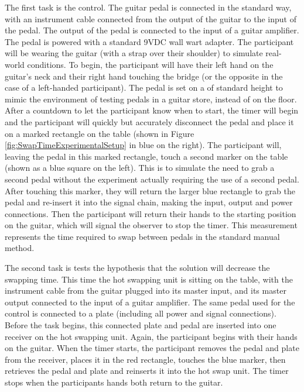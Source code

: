 \documentclass{article}
\begin{document}
	The first task is the control.  The guitar pedal is connected in the standard way, with an instrument cable connected from the output of the guitar to the input of the pedal.  The output of the pedal is connected to the input of a guitar amplifier.  The pedal is powered with a standard 9VDC wall wart adapter. The participant will be wearing the guitar (with a strap over their shoulder) to simulate real-world conditions.  To begin, the participant will have their left hand on the guitar's neck and their right hand touching the bridge (or the opposite in the case of a left-handed participant).  The pedal is set on a of standard height to mimic the environment of testing pedals in a guitar store, instead of on the floor.  After a countdown to let the participant know when to start, the timer will begin and the participant will quickly but accurately disconnect the pedal and place it on a marked rectangle on the table (shown in Figure \ref{fig:SwapTimeExperimentalSetup} in blue on the right).  The participant will, leaving the pedal in this marked rectangle, touch a second marker on the table (shown as a blue square on the left).  This is to simulate the need to grab a second pedal without the experiment actually requiring the use of a second pedal.  After touching this marker, they will return the larger blue rectangle to grab the pedal and re-insert it into the signal chain, making the input, output and power connections.  Then the participant will return their hands to the starting position on the guitar, which will signal the observer to stop the timer.  This measurement represents the time required to swap between pedals in the standard manual method.

	The second task is tests the hypothesis that the solution will decrease the swapping time.  This time the hot swapping unit is sitting on the table, with the instrument cable from the guitar plugged into its master input, and its master output connected to the input of a guitar amplifier.  The same pedal used for the control is connected to a plate (including all power and signal connections).  Before the task begins, this connected plate and pedal are inserted into one receiver on the hot swapping unit.  Again, the participant begins with their hands on the guitar.  When the timer starts, the participant removes the pedal and plate from the receiver, places it in the red rectangle, touches the blue marker, then retrieves the pedal and plate and reinserts it into the hot swap unit.  The timer stops when the participants hands both return to the guitar.  
\end{document}
